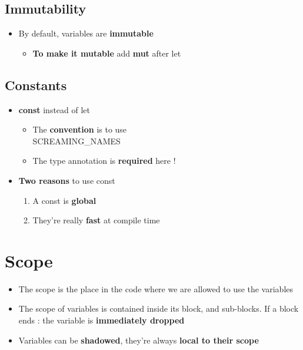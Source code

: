 \documentclass{report}
\begin{document}
\begin{multicols*}{2}
\subsection{Immutability}

\begin{itemize}
	\item By default, variables are \textbf{immutable} 
		\begin{itemize}
			\item \textbf{To make it mutable} add \textbf{mut} after let
		\end{itemize}
\end{itemize}

\subsection{Constants}

\begin{itemize}
	\item \textbf{const} instead of let
		\begin{itemize}
			\item The \textbf{convention} is to use\\ 
        SCREAMING\_NAMES 
			\item The type annotation is \textbf{required} here !
		\end{itemize}
	\item \textbf{Two reasons} to use const
		\begin{enumerate}
			\item A const is \textbf{global}  
			\item They're really \textbf{fast} at compile time
		\end{enumerate}
\end{itemize}


\section{Scope}

\begin{itemize}
	\item The scope is the place in the code where we are allowed to use the variables 
	\item The scope of variables is contained inside its block, and sub-blocks. If a block ends : the variable is \textbf{immediately dropped} 
	\item Variables can be \textbf{shadowed}, they're always \textbf{local to their scope}  
\end{itemize}


\end{multicols*}
\end{document}
